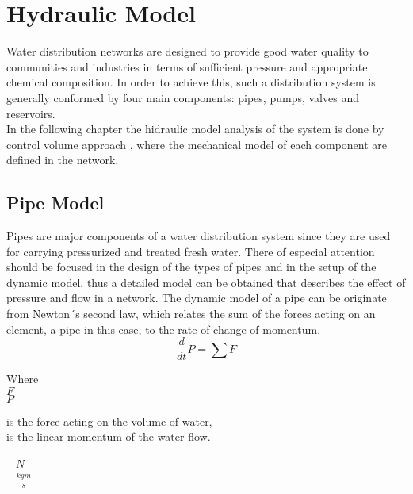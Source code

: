 \section{Hydraulic Model}
\label{HydraulicModel}

Water distribution networks are designed to provide good water quality to communities and industries in 
terms of sufficient pressure and appropriate chemical composition. In order to achieve this, such a distribution system is generally conformed by four main components: pipes, pumps, valves and reservoirs. 
\\

In the following chapter the hidraulic model analysis of the system is done by control volume approach \cite{Hunt_Fluidmechanics}, 
where the mechanical model of each component are defined in the network. 

\subsection{Pipe Model} 
\label{PipeModel}
Pipes are major components of a water distribution system since they are used for carrying pressurized and treated fresh water. There  of especial attention should be focused in the design of the types of pipes and in the setup of the dynamic model, thus a detailed model can be obtained that describes the effect of pressure and flow in a network. 
%
The dynamic model of a pipe can be originate from Newton´s second law, which relates the sum of the 
forces acting on an element, a pipe in this case, to the rate of change of momentum.
\begin{equation}
  \frac{d}{dt} P = \sum F
  \label{NewtonLaw}
\end{equation} 

\begin{minipage}[t]{0.20\textwidth}
Where\\
\hspace*{8mm} $F$ \\
\hspace*{8mm} $P$ 
\end{minipage}
\begin{minipage}[t]{0.68\textwidth}
\vspace*{2mm}
is the force acting on the volume of water,\\
is the linear momentum of the water flow.

\end{minipage}
\begin{minipage}[t]{0.10\textwidth}
\vspace*{2mm}
\textcolor{White}{te}$\unit{N}$\\
\textcolor{White}{te}$\unit{\frac{kgm}{s}}$
\end{minipage}

